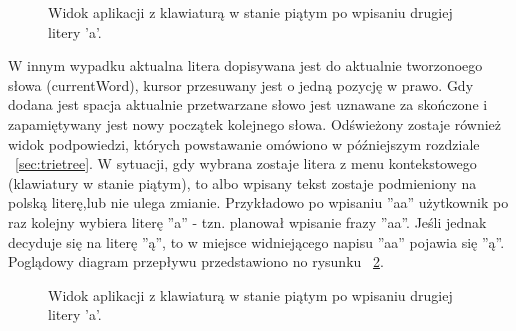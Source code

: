 \documentclass[twoside,a4paper]{book}
\begin{document}
\begin{figure}[!h]
		\centering
		\caption{Widok aplikacji z klawiaturą w stanie piątym po wpisaniu drugiej litery 'a'.}
		\label{fig:doubleA}
\end{figure}
W innym wypadku aktualna litera dopisywana jest do aktualnie tworzonoego słowa (currentWord), kursor przesuwany jest o jedną pozycję w prawo. Gdy dodana jest spacja aktualnie przetwarzane słowo jest uznawane za skończone i zapamiętywany jest nowy początek kolejnego słowa. Odświeżony zostaje również widok podpowiedzi, których powstawanie omówiono w późniejszym rozdziale ~\ref{sec:trietree}.
W sytuacji, gdy wybrana zostaje litera z menu kontekstowego (klawiatury w stanie piątym), to albo wpisany tekst zostaje podmieniony na polską literę,lub nie ulega zmianie. Przykładowo po wpisaniu ''aa'' użytkownik po raz kolejny wybiera literę ''a'' - tzn. planował wpisanie frazy ''aa''. Jeśli jednak decyduje się na literę ''ą'', to w miejsce widniejącego napisu ''aa'' pojawia się ''ą''.
Poglądowy diagram przepływu przedstawiono no rysunku ~\ref{fig:wordFlow}.
\begin{figure}[!h]
		\centering
		\caption{Widok aplikacji z klawiaturą w stanie piątym po wpisaniu drugiej litery 'a'.}
		\label{fig:wordFlow}
\end{figure}
\end{document}
